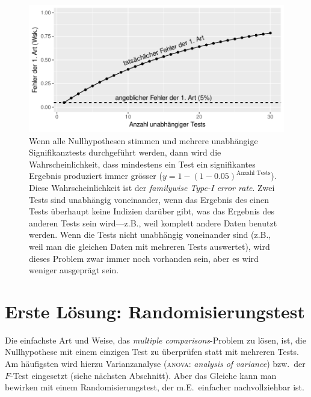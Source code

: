 \documentclass[oneside, 10pt]{book}\usepackage[]{graphicx}\usepackage[]{xcolor}
\newenvironment{knitrout}{}{} %
\begin{document}
\begin{knitrout}
\color{fgcolor}\begin{figure}[tp]

{\centering \includegraphics[width=.7\textwidth]{figs/unnamed-chunk-381-1} 

}

\caption{Wenn alle Nullhypothesen stimmen und mehrere unabhängige Signifikanztests durchgeführt werden, dann wird die Wahrscheinlichkeit, dass mindestens ein Test ein signifikantes Ergebnis produziert immer grösser ($y = 1 - (1 - 0.05)^\textrm{Anzahl Tests}$). Diese Wahrscheinlichkeit ist der \textit{familywise Type-I error rate}. Zwei Tests sind unabhängig voneinander, wenn das Ergebnis des einen Tests überhaupt keine Indizien darüber gibt, was das Ergebnis des anderen Tests sein wird---z.B., weil komplett andere Daten benutzt werden. Wenn die Tests nicht unabhängig voneinander sind (z.B., weil man die gleichen Daten mit mehreren Tests auswertet), wird dieses Problem zwar immer noch vorhanden sein, aber es wird weniger ausgeprägt sein.\label{fig:familywise}}\label{fig:unnamed-chunk-381}
\end{figure}

\end{knitrout}

\section{Erste Lösung: Randomisierungstest}
Die einfachste Art und Weise, das \textit{multiple comparisons}-Problem
zu lösen, ist, die Nullhypothese mit einem einzigen Test zu überprüfen
statt mit mehreren Tests. Am häufigsten wird hierzu Varianzanalyse (\textsc{anova}: \textit{analysis of variance})
bzw.\ der $F$-Test eingesetzt (siehe nächsten Abschnitt). Aber das Gleiche
kann man bewirken mit einem Randomisierungstest, der m.E.\ einfacher nachvollziehbar ist.
\end{document}
